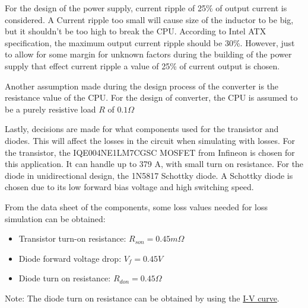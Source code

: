 \documentclass{article}
\begin{document}
For the design of the power supply, current ripple of 25\% of output current is considered.
A Current ripple too small will cause size of the inductor to be big, but it shouldn't be too high to break the CPU.
According to Intel ATX specification, the maximum output current ripple should be 30\%. \cite{intel-design-guide}
However, just to allow for some margin for unknown factors during the building of the power supply that effect current ripple a value of 25\% of current output is chosen.

Another assumption made during the design process of the converter is the resistance value of the CPU.
For the design of converter, the CPU is assumed to be a purely resistive load $R$ of $0.1 \Omega$

Lastly, decisions are made for what components used for the transistor and diodes.
This will affect the losses in the circuit when simulating with losses.
For the transistor, the IQE004NE1LM7CGSC MOSFET from Infineon is chosen for this application.
It can handle up to 379 A, with small turn on resistance.
For the diode in unidirectional design, the 1N5817 Schottky diode.
A Schottky diode is chosen due to its low forward bias voltage and high switching speed.

From the data sheet of the components, some loss values needed for loss simulation can be obtained:

\begin{itemize}
    \item Transistor turn-on resistance: $R_{son} = 0.45 m\Omega$
    \item Diode forward voltage drop: $V_{f} = 0.45 V$
    \item Diode turn on resistance: $R_{don} = 0.45 \Omega$
\end{itemize}

Note: The diode turn on resistance can be obtained by using the \hyperref[fig:IV-curve-diode]{I-V curve}.
\end{document}
